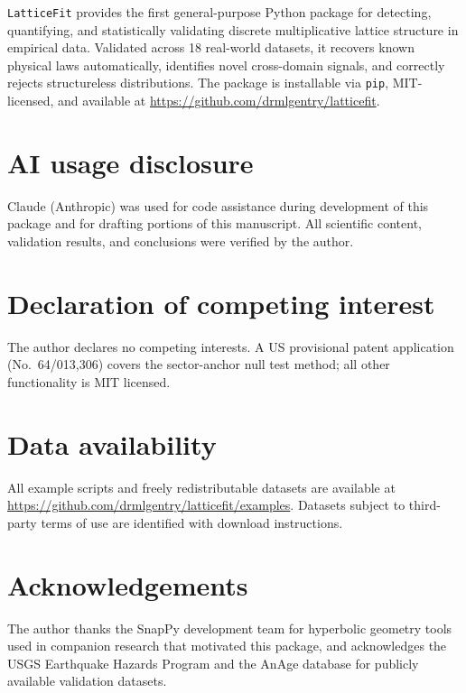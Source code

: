 \documentclass[preprint,12pt]{elsarticle}
\begin{document}
\texttt{LatticeFit} provides the first general-purpose Python
package for detecting, quantifying, and statistically validating
discrete multiplicative lattice structure in empirical data.
Validated across 18 real-world datasets, it recovers known physical
laws automatically, identifies novel cross-domain signals, and
correctly rejects structureless distributions. The package is
installable via \texttt{pip}, MIT-licensed, and available at
\url{https://github.com/drmlgentry/latticefit}.

\section*{AI usage disclosure}
Claude (Anthropic) was used for code assistance during development
of this package and for drafting portions of this manuscript.
All scientific content, validation results, and conclusions were
verified by the author.

\section*{Declaration of competing interest}
The author declares no competing interests. A US provisional patent
application (No.\ 64/013,306) covers the sector-anchor null test
method; all other functionality is MIT licensed.

\section*{Data availability}
All example scripts and freely redistributable datasets are
available at
\url{https://github.com/drmlgentry/latticefit/examples}.
Datasets subject to third-party terms of use are identified with
download instructions.

\section*{Acknowledgements}
The author thanks the SnapPy development team for hyperbolic
geometry tools used in companion research that motivated this
package, and acknowledges the USGS Earthquake Hazards Program and
the AnAge database for publicly available validation datasets.
\end{document}
